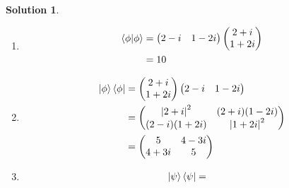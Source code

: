 \documentclass[10pt]{article}
\theoremstyle{definition}
\newtheorem{soln}{Solution}
\begin{document}
\begin{soln}
\begin{enumerate}[label=(\alph*)]
\begin{enumerate} [label=(\roman*)]
\begin{align*}
\begin{pmatrix}
                      4+3i
                    \end{pmatrix}             \\
                                        & = 50
                  \end{align*}
            \item \begin{align*}
                    \braket{\phi}{\phi} & =
                    \begin{pmatrix}
                      2-i & 1-2i
                    \end{pmatrix}
                    \begin{pmatrix}
                      2+i \\
                      1+2i
                    \end{pmatrix}             \\
                                        & = 10
                  \end{align*}
            \item \begin{align*}
                    \ket{\phi}\bra{\phi} & =
                    \begin{pmatrix}
                      2+i \\
                      1+2i
                    \end{pmatrix}
                    \begin{pmatrix}
                      2-i & 1-2i
                    \end{pmatrix}                           \\
                                         & =
                    \begin{pmatrix}
                      \left|2+i\right|^2 & (2+i)(1-2i)         \\
                      (2-i)(1+2i)        & \left|1+2i\right|^2
                    \end{pmatrix} \\
                                         & =
                    \begin{pmatrix}
                      5    & 4-3i \\
                      4+3i & 5
                    \end{pmatrix}
                  \end{align*}
            \item \begin{align*}
                    \ket{\psi}\bra{\psi} & =

\end{align*}
\end{enumerate}
\end{enumerate}
\end{soln}
\end{document}
